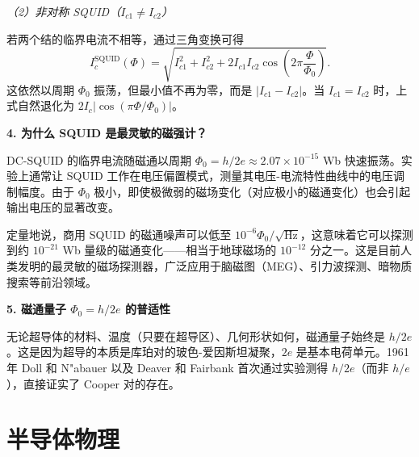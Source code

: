\begin{insightbox}[举一反三与物理直觉]
\textit{（2）非对称 SQUID（$I_{c1}\neq I_{c2}$）}

若两个结的临界电流不相等，通过三角变换可得
\[
I_c^{\text{SQUID}}(\Phi) = \sqrt{I_{c1}^2 + I_{c2}^2 + 2I_{c1}I_{c2}\cos\left(2\pi\frac{\Phi}{\Phi_0}\right)}.
\]
这依然以周期 $\Phi_0$ 振荡，但最小值不再为零，而是 $|I_{c1}-I_{c2}|$。当 $I_{c1}=I_{c2}$ 时，上式自然退化为 $2I_c|\cos(\pi\Phi/\Phi_0)|$。

\textbf{4. 为什么 SQUID 是最灵敏的磁强计？}

DC-SQUID 的临界电流随磁通以周期 $\Phi_0 = h/2e \approx 2.07\times 10^{-15}$ Wb 快速振荡。实验上通常让 SQUID 工作在电压偏置模式，测量其电压-电流特性曲线中的电压调制幅度。由于 $\Phi_0$ 极小，即使极微弱的磁场变化（对应极小的磁通变化）也会引起输出电压的显著改变。

定量地说，商用 SQUID 的磁通噪声可以低至 $10^{-6}\Phi_0/\sqrt{\text{Hz}}$，这意味着它可以探测到约 $10^{-21}$ Wb 量级的磁通变化——相当于地球磁场的 $10^{-12}$ 分之一。这是目前人类发明的最灵敏的磁场探测器，广泛应用于脑磁图（MEG）、引力波探测、暗物质搜索等前沿领域。

\textbf{5. 磁通量子 $\Phi_0 = h/2e$ 的普适性}

无论超导体的材料、温度（只要在超导区）、几何形状如何，磁通量子始终是 $h/2e$。这是因为超导的本质是库珀对的玻色-爱因斯坦凝聚，$2e$ 是基本电荷单元。1961 年 Doll 和 N"{a}bauer 以及 Deaver 和 Fairbank 首次通过实验测得 $h/2e$（而非 $h/e$），直接证实了 Cooper 对的存在。
\end{insightbox}

\newpage
\newpage
\newpage
\newpage
\newpage

\newpage

\newpage

\newpage

\newpage

\newpage

\newpage

\newpage

\part{半导体物理}\label{part:semi}\setpartcolor{\value{part}}
\newpage

\newpage

\newpage

\newpage

\newpage

\newpage

\newpage

\newpage

\newpage

\newpage

\newpage

\newpage

\newpage

\newpage

\newpage

\newpage

\newpage

\newpage

\newpage

\newpage

\newpage

\newpage

\newpage

\newpage

\newpage

\newpage


